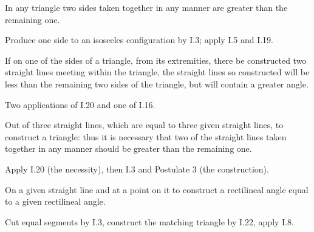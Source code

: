 \begin{claim}
\label{prop:I.20}
In any triangle two sides taken together in any manner are greater
than the remaining one.
\end{claim}
\begin{evidence}[Proof of I.20]
\label{ev:I.20}
Produce one side to an isosceles configuration by I.3; apply I.5 and
I.19.
\end{evidence}

\begin{claim}
\label{prop:I.21}
If on one of the sides of a triangle, from its extremities, there be
constructed two straight lines meeting within the triangle, the
straight lines so constructed will be less than the remaining two
sides of the triangle, but will contain a greater angle.
\end{claim}
\begin{evidence}[Proof of I.21]
\label{ev:I.21}
Two applications of I.20 and one of I.16.
\end{evidence}

\begin{claim}
\label{prop:I.22}
Out of three straight lines, which are equal to three given straight
lines, to construct a triangle: thus it is necessary that two of the
straight lines taken together in any manner should be greater than the
remaining one.
\end{claim}
\begin{evidence}[Proof of I.22]
\label{ev:I.22}
Apply I.20 (the necessity), then I.3 and Postulate 3 (the
construction).
\end{evidence}

\begin{claim}
\label{prop:I.23}
On a given straight line and at a point on it to construct a
rectilineal angle equal to a given rectilineal angle.
\end{claim}
\begin{evidence}[Proof of I.23]
\label{ev:I.23}
Cut equal segments by I.3, construct the matching triangle by I.22,
apply I.8.
\end{evidence}

